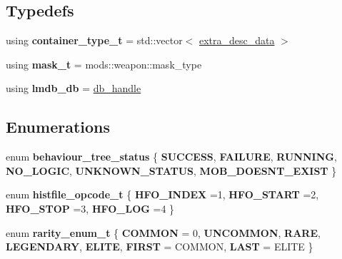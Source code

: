 \subsection*{Typedefs}
\begin{DoxyCompactItemize}
\item 
\mbox{\label{namespacemods_a00b664aad4148632b9bf6ae75edf5e6f}} 
using {\bfseries container\+\_\+type\+\_\+t} = std\+::vector$<$ \hyperlink{structmods_1_1extra__desc__data}{extra\+\_\+desc\+\_\+data} $>$
\item 
\mbox{\label{namespacemods_a7dae9576983aa2d6bc4f03fec7ceb9a8}} 
using {\bfseries mask\+\_\+t} = mods\+::weapon\+::mask\+\_\+type
\item 
\mbox{\label{namespacemods_a48ff20339fef03fd4f1bd17ce59ea469}} 
using {\bfseries lmdb\+\_\+db} = \hyperlink{structmods_1_1lmdb_1_1__db__handle}{db\+\_\+handle}
\end{DoxyCompactItemize}
\subsection*{Enumerations}
\begin{DoxyCompactItemize}
\item 
\mbox{\label{namespacemods_aedd8fe7f6b05c601c23a842577bfaf2d}} 
enum {\bfseries behaviour\+\_\+tree\+\_\+status} \{ \newline
{\bfseries S\+U\+C\+C\+E\+SS}, 
{\bfseries F\+A\+I\+L\+U\+RE}, 
{\bfseries R\+U\+N\+N\+I\+NG}, 
{\bfseries N\+O\+\_\+\+L\+O\+G\+IC}, 
\newline
{\bfseries U\+N\+K\+N\+O\+W\+N\+\_\+\+S\+T\+A\+T\+US}, 
{\bfseries M\+O\+B\+\_\+\+D\+O\+E\+S\+N\+T\+\_\+\+E\+X\+I\+ST}
 \}
\item 
\mbox{\label{namespacemods_a20f5dc4d7d0a79ea776dea59daffea20}} 
enum {\bfseries histfile\+\_\+opcode\+\_\+t} \{ {\bfseries H\+F\+O\+\_\+\+I\+N\+D\+EX} =1, 
{\bfseries H\+F\+O\+\_\+\+S\+T\+A\+RT} =2, 
{\bfseries H\+F\+O\+\_\+\+S\+T\+OP} =3, 
{\bfseries H\+F\+O\+\_\+\+L\+OG} =4
 \}
\item 
\mbox{\label{namespacemods_a2df2aa05ac0869b08ffefcb0455025f9}} 
enum {\bfseries rarity\+\_\+enum\+\_\+t} \{ \newline
{\bfseries C\+O\+M\+M\+ON} = 0, 
{\bfseries U\+N\+C\+O\+M\+M\+ON}, 
{\bfseries R\+A\+RE}, 
{\bfseries L\+E\+G\+E\+N\+D\+A\+RY}, 
\newline
{\bfseries E\+L\+I\+TE}, 
{\bfseries F\+I\+R\+ST} = C\+O\+M\+M\+ON, 
{\bfseries L\+A\+ST} = E\+L\+I\+TE
 \}
\end{DoxyCompactItemize}
